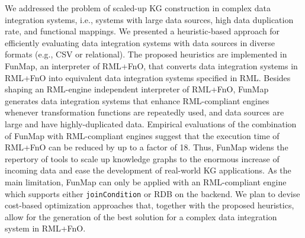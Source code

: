 We addressed the problem of scaled-up KG construction in complex data integration systems, i.e., systems with large data sources, high data duplication rate, and functional mappings. We presented a heuristic-based approach for efficiently evaluating data integration systems with data sources in diverse formats (e.g., CSV or relational). The proposed heuristics are implemented in FunMap, an interpreter of RML+FnO, that converts data integration systems in RML+FnO into equivalent data integration systems specified in RML. Besides shaping an RML-engine independent interpreter of RML+FnO, FunMap generates data integration systems that enhance RML-compliant engines whenever transformation functions are repeatedly used, and data sources are large and have highly-duplicated data. Empirical evaluations of the combination of FunMap with RML-compliant engines suggest that the execution time of RML+FnO can be reduced by up to a factor of 18. Thus, FunMap widens the repertory of tools to scale up knowledge graphs to the enormous increase of incoming data and ease the development of real-world KG applications. As the main limitation, FunMap can only be applied with an RML-compliant engine which supports either \verb|joinCondition| or RDB on the backend. We plan to devise cost-based optimization approaches that, together with the proposed heuristics, allow for the generation of the best solution for a complex data integration system in RML+FnO. 
